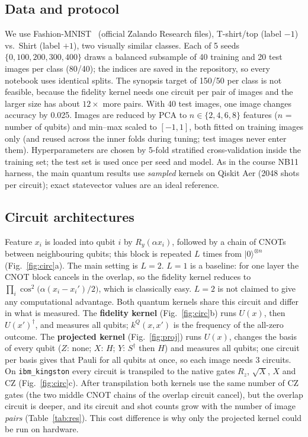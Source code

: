 \documentclass[conference]{IEEEtran}
\begin{document}
\subsection{Data and protocol}
We use Fashion-MNIST~\cite{xiao2017} (official Zalando Research files), T-shirt/top (label $-1$) vs.\ Shirt (label $+1$), two visually similar classes. Each of 5 seeds $\{0,100,200,300,400\}$ draws a balanced subsample of 40 training and 20 test images per class (80/40); the indices are saved in the repository, so every notebook uses identical splits. The synopsis target of 150/50 per class is not feasible, because the fidelity kernel needs one circuit per pair of images and the larger size has about $12\times$ more pairs. With 40 test images, one image changes accuracy by 0.025. Images are reduced by PCA to $n\in\{2,4,6,8\}$ features ($n$ = number of qubits) and min--max scaled to $[-1,1]$, both fitted on training images only (and reused across the inner folds during tuning; test images never enter them). Hyperparameters are chosen by 5-fold stratified cross-validation inside the training set; the test set is used once per seed and model. As in the course NB11 harness, the main quantum results use \emph{sampled} kernels on Qiskit Aer (2048 shots per circuit); exact statevector values are an ideal reference.

\subsection{Circuit architectures}\label{sec:circ}
Feature $x_i$ is loaded into qubit $i$ by $R_y(\alpha x_i)$, followed by a chain of CNOTs between neighbouring qubits; this block is repeated $L$ times from $|0\rangle^{\otimes n}$ (Fig.~\ref{fig:circ}a). The main setting is $L=2$. $L=1$ is a baseline: for one layer the CNOT block cancels in the overlap, so the fidelity kernel reduces to $\prod_i\cos^2\!\big(\alpha(x_i-x_i')/2\big)$, which is classically easy. $L=2$ is not claimed to give any computational advantage. Both quantum kernels share this circuit and differ in what is measured. The \textbf{fidelity kernel} (Fig.~\ref{fig:circ}b) runs $U(x)$, then $U(x')^\dagger$, and measures all qubits; $k^{Q}(x,x')$ is the frequency of the all-zero outcome. The \textbf{projected kernel} (Fig.~\ref{fig:proj}) runs $U(x)$, changes the basis of every qubit ($Z$: none; $X$: $H$; $Y$: $S^\dagger$ then $H$) and measures all qubits; one circuit per basis gives that Pauli for all qubits at once, so each image needs 3 circuits. On \texttt{ibm\_kingston} every circuit is transpiled to the native gates $R_z$, $\sqrt{X}$, $X$ and CZ (Fig.~\ref{fig:circ}c). After transpilation both kernels use the same number of CZ gates (the two middle CNOT chains of the overlap circuit cancel), but the overlap circuit is deeper, and its circuit and shot counts grow with the number of image \emph{pairs} (Table~\ref{tab:res}). This cost difference is why only the projected kernel could be run on hardware.
\end{document}
